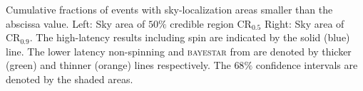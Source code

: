 \label{fig:sky} Cumulative fractions of events with sky-localization areas smaller than the abscissa value. Left: Sky area of $50\%$ credible region $\mathrm{CR}_{0.5}$ Right: Sky area of $\mathrm{CR}_{0.9}$. The high-latency results including spin are indicated by the solid (blue) line. The lower latency non-spinning and \textsc{bayestar} from \citet{Singer_2014} are denoted by thicker (green) and thinner (orange) lines respectively. The $68\%$ confidence intervals are denoted by the shaded areas.